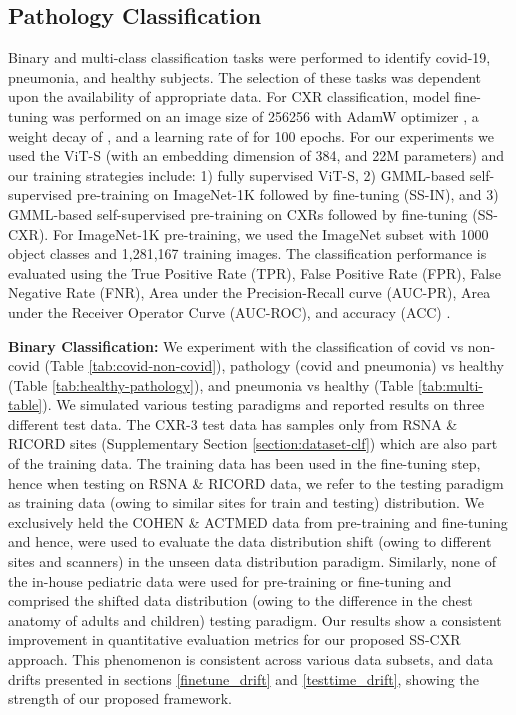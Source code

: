 \documentclass[10pt,journal,compsoc]{IEEEtran}
\begin{document}
\subsection{Pathology Classification}
\label{sec:exp_classification}
Binary and multi-class classification tasks were performed to identify covid-19, pneumonia, and healthy subjects. The selection of these tasks was dependent upon the availability of appropriate data. For CXR classification, model fine-tuning was performed on an image size of 256256 with AdamW optimizer \cite{adamw}, a weight decay of , and a learning rate of  for 100 epochs. For our experiments we used the ViT-S (with an embedding dimension of 384, and 22M parameters) and our training strategies include: 1) fully supervised ViT-S, 2) GMML-based self-supervised pre-training on ImageNet-1K followed by fine-tuning (SS-IN), and 3) GMML-based self-supervised pre-training on CXRs followed by fine-tuning (SS-CXR). For ImageNet-1K pre-training, we used the ImageNet subset with 1000 object classes and 1,281,167 training images.  The classification performance is evaluated using the True Positive Rate (TPR), False Positive Rate (FPR), False Negative Rate (FNR), Area under the Precision-Recall curve (AUC-PR), Area under the Receiver Operator Curve (AUC-ROC), and accuracy (ACC) \cite{biship2007pattern}. 

\noindent \textbf{Binary Classification:}
We experiment with the classification of covid vs non-covid (Table \ref{tab:covid-non-covid}), pathology (covid and pneumonia) vs healthy  (Table \ref{tab:healthy-pathology}), and pneumonia vs healthy (Table \ref{tab:multi-table}). We simulated various testing paradigms and reported results on three different test data. The CXR-3 test data has samples only from RSNA \& RICORD sites (Supplementary Section \ref{section:dataset-clf}) which are also part of the training data. The training data has been used in the fine-tuning step, hence when testing on RSNA \& RICORD data, we refer to the testing paradigm as training data (owing to similar sites for train and testing) distribution. We exclusively held the COHEN \& ACTMED data from pre-training and fine-tuning and hence, were used to evaluate the data distribution shift (owing to different sites and scanners) in the unseen data distribution paradigm. Similarly, none of the in-house pediatric data were used for pre-training or fine-tuning and comprised the shifted data distribution (owing to the difference in the chest anatomy of adults and children) testing paradigm. Our results show a consistent improvement in quantitative evaluation metrics for our proposed SS-CXR approach. This phenomenon is consistent across various data subsets, and data drifts presented in sections \ref{finetune_drift} and \ref{testtime_drift}, showing the strength of our proposed framework.
\end{document}
